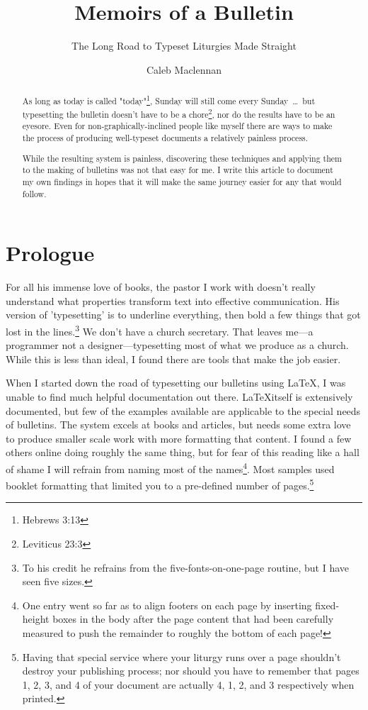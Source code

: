 \documentclass[12pt]{scrartcl}
\title{Memoirs of a Bulletin}
\subtitle{The Long Road to Typeset Liturgies Made Straight}
\author{Caleb Maclennan}
\makeatletter
\let\svmaketitle\maketitle
\def\maketitle{\protected@edef\saved@title{\@title}%
	\svmaketitle%
	\let\@title\saved@title}%
\makeatother
\begin{document}

\maketitle

\vfill

\begin{abstract}

As long as today is called "today"\footnote{Hebrews 3:13}, Sunday will still
come every Sunday~\dots~but typesetting the bulletin doesn't have to be a
chore\footnote{Leviticus 23:3}, nor do the results have to be an eyesore. Even
for non-graphically-inclined people like myself there are ways to make the
process of producing well-typeset documents a relatively painless process.

While the resulting system is painless, discovering these techniques and
applying them to the making of bulletins was not that easy for me. I write this
article to document my own findings in hopes that it will make the same journey
easier for any that would follow.

\end{abstract}

\section*{Prologue}

For all his immense love of books, the pastor I work with doesn't really
understand what properties transform text into effective communication. His
version of 'typesetting' is to underline everything, then bold a few things that
got lost in the lines.\footnote{To his credit he refrains from the
	five-fonts-on-one-page routine, but I have seen five sizes.} We don't
have a church secretary. That leaves me---a programmer not a
designer---typesetting most of what we produce as a church. While this is less
than ideal, I found there are tools that make the job easier.

When I started down the road of typesetting our bulletins using \LaTeX, I was
unable to find much helpful documentation out there. \LaTeX itself is
extensively documented, but few of the examples available are applicable to the
special needs of bulletins. The system excels at books and articles, but needs
some extra love to produce smaller scale work with more formatting that content.
I found a few others online doing roughly the same thing, but for fear of this
reading like a hall of shame I will refrain from naming most of the
names\footnote{One entry went so far as to align footers on each page by
	inserting fixed-height boxes in the body after the page content that had
	been carefully measured to push the remainder to roughly the bottom of
	each page!}.  Most samples used booklet formatting that limited you to a
pre-defined number of pages.\footnote{Having that special service where your
	liturgy runs over a page shouldn't destroy your publishing process; nor
	should you have to remember that pages 1, 2, 3, and 4 of your document
	are actually 4, 1, 2, and 3 respectively when printed.}
\end{document}
